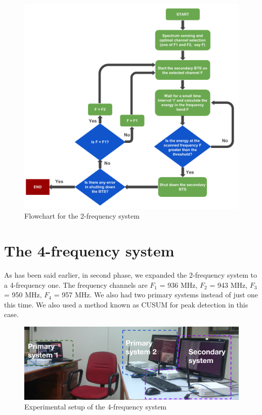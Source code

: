 \begin{figure}
\centering
\includegraphics[width=1\textwidth]{../images/freqSys2}
\caption[2-frequency system]{Flowchart for the 2-frequency system}
\label{freqSys2}
\end{figure}



\section{The 4-frequency system}

As has been said earlier, in second phase, we expanded the 2-frequency
system to a 4-frequency one. The frequency channels are $F_1$ = 936 MHz, 
$F_2$ = 943 MHz, $F_3$ = 950 MHz, $F_4$ = 957 MHz. We also had two primary 
systems instead of just one this time. We also used a method known as CUSUM 
for peak detection in this case.

\begin{figure}
\centering
\includegraphics[width=1\textwidth]{../images/freq4}
\caption[Experimental setup, 4-frequency system]{Experimental setup of the 
4-frequency system}
\label{freq4}
\end{figure}

